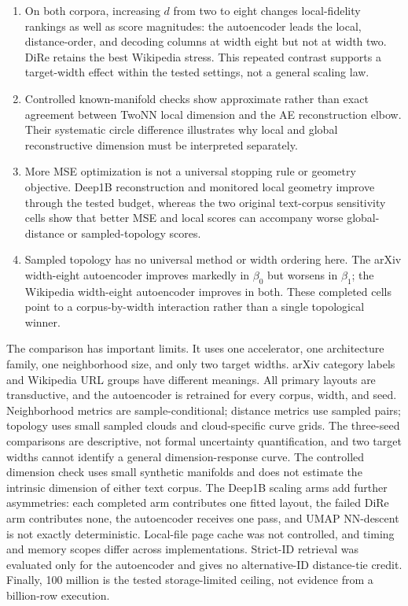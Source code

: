\documentclass[10pt]{article}
\begin{document}
\begin{enumerate}
  \item On both corpora, increasing $d$ from two to eight changes local-fidelity rankings
        as well as score magnitudes: the autoencoder leads the local, distance-order, and
        decoding columns at width eight but not at width two.  DiRe retains the best
        Wikipedia stress.  This repeated contrast supports a target-width effect within
        the tested settings, not a general scaling law.
  \item Controlled known-manifold checks show approximate rather than exact agreement
        between TwoNN local dimension and the AE reconstruction elbow.  Their systematic
        circle difference illustrates why local and global reconstructive dimension must
        be interpreted separately.
  \item More MSE optimization is not a universal stopping rule or geometry objective.
        Deep1B reconstruction and monitored local geometry improve through the tested
        budget, whereas the two original text-corpus sensitivity cells show that better
        MSE and local scores can accompany worse global-distance or sampled-topology
        scores.
  \item Sampled topology has no universal method or width ordering here.  The arXiv
        width-eight autoencoder improves markedly in $\beta_0$ but worsens in $\beta_1$;
        the Wikipedia width-eight autoencoder improves in both.  These completed cells
        point to a corpus-by-width interaction rather than a single topological winner.
\end{enumerate}

The comparison has important limits.  It uses one accelerator, one architecture family,
one neighborhood size, and only two target widths.  arXiv category labels and Wikipedia
URL groups have different meanings.  All primary layouts are transductive, and the
autoencoder is retrained for every corpus, width, and seed.  Neighborhood metrics are
sample-conditional; distance metrics use sampled pairs; topology uses small sampled
clouds and cloud-specific curve grids.  The three-seed comparisons are descriptive, not
formal uncertainty quantification, and two target widths cannot identify a general
dimension-response curve.  The controlled dimension check uses small synthetic
manifolds and does not estimate the intrinsic dimension of either text corpus.
The Deep1B scaling arms add further asymmetries: each completed arm contributes one
fitted layout, the failed DiRe arm contributes none, the autoencoder receives one pass,
and UMAP NN-descent is not exactly deterministic.  Local-file page
cache was not controlled, and timing and memory scopes differ across implementations.
Strict-ID retrieval was evaluated only for the autoencoder and gives no alternative-ID
distance-tie credit.  Finally, 100 million is the tested storage-limited ceiling, not
evidence from a billion-row execution.
\end{document}
